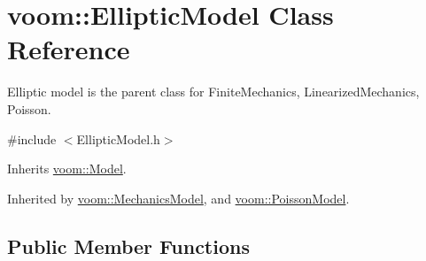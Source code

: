 \hypertarget{classvoom_1_1_elliptic_model}{
\section{voom::EllipticModel Class Reference}
\label{classvoom_1_1_elliptic_model}
}


Elliptic model is the parent class for FiniteMechanics, LinearizedMechanics, Poisson.  


{\ttfamily \#include $<$EllipticModel.h$>$}

Inherits \hyperlink{classvoom_1_1_model}{voom::Model}.

Inherited by \hyperlink{classvoom_1_1_mechanics_model}{voom::MechanicsModel}, and \hyperlink{classvoom_1_1_poisson_model}{voom::PoissonModel}.\subsection*{Public Member Functions}
